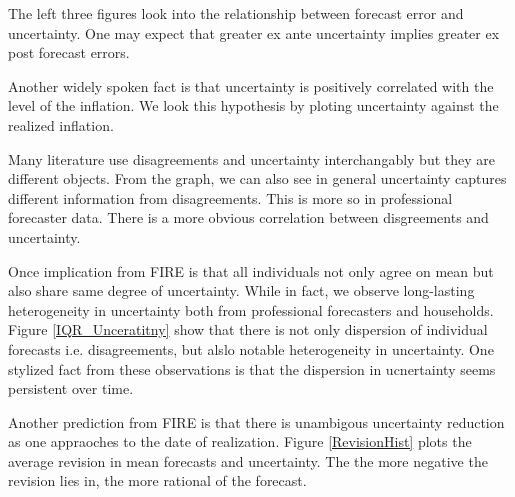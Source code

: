 \documentclass[]{article}
\begin{document}
The left  three figures look into the relationship between forecast error and uncertainty. One may expect that  greater ex ante uncertainty implies greater ex post forecast errors. 


Another widely spoken fact is that uncertainty is positively correlated with the level of the inflation. We look this hypothesis by ploting uncertainty against the realized inflation.  
 
Many literature use disagreements and uncertainty interchangably but they are different objects. From the graph, we can also see in general uncertainty captures different information from disagreements. This is more so in professional forecaster data. There is a more obvious correlation between disgreements and uncertainty. 


Once implication from FIRE is that all individuals not only agree on mean but also share same degree of uncertainty. While in fact, we observe long-lasting heterogeneity in uncertainty both from professional forecasters and households. Figure \ref{IQR_Unceratitny} show that there is  not only dispersion of individual forecasts i.e. disagreements, but alslo notable heterogeneity in uncertainty. One stylized fact from these observations is that  the dispersion in ucnertainty seems persistent over time.  
 

Another prediction from FIRE is that there is unambigous uncertainty reduction as one appraoches to the date of realization. Figure \ref{RevisionHist} plots the average revision in mean forecasts and uncertainty. The the more negative the revision lies in, the more rational of the forecast.  
\end{document}
